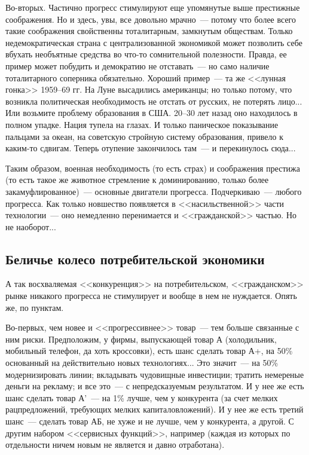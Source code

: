 \documentclass{scrbook}
\newcommand{\flqq}{<<}
\newcommand{\frqq}{>>}
\newcommand{\mdash}{~--- }
\newcommand{\ndash}{--}
\newcommand{\essaysection}[1]{\subsection*{#1}\nopagebreak}
\begin{document}
Во-вторых. Частично прогресс стимулируют еще упомянутые выше престижные соображения. Но и здесь, увы, все довольно мрачно{\mdash}потому что более всего такие соображения свойственны тоталитарным, замкнутым обществам. Только недемократическая страна с централизованной экономикой может позволить себе вбухать необъятные средства во что-то сомнительной полезности. Правда, ее пример может побудить и демократию не отставать{\mdash}но само наличие тоталитарного соперника обязательно. Хороший пример{\mdash}та же {\flqq}лунная гонка{\frqq} 1959{\ndash}69 гг. На Луне высадились американцы; но только потому, что возникла политическая необходимость не отстать от русских, не потерять лицо... Или возьмите проблему образования в США. 20{\ndash}30 лет назад оно находилось в полном упадке. Нация тупела на глазах. И только паническое показывание пальцами за океан, на советскую стройную систему образования, привело к каким-то сдвигам. Теперь отупение закончилось там{\mdash}и перекинулось сюда...

Таким образом, военная необходимость (то есть страх) и соображения престижа (то есть такое же животное стремление к доминированию, только более закамуфлированное){\mdash}основные двигатели прогресса. Подчеркиваю{\mdash}любого прогресса. Как только новшество появляется в {\flqq}насильственной{\frqq} части технологии{\mdash}оно немедленно перенимается и {\flqq}гражданской{\frqq} частью. Но не наоборот...

\essaysection{Беличье колесо потребительской экономики}

А так восхваляемая {\flqq}конкуренция{\frqq} на потребительском, {\flqq}гражданском{\frqq} рынке никакого прогресса не стимулирует и вообще в нем не нуждается. Опять же, по пунктам.

Во-первых, чем новее и {\flqq}прогрессивнее{\frqq} товар{\mdash}тем больше связанные с ним риски. Предположим, у фирмы, выпускающей товар А (холодильник, мобильный телефон, да хоть кроссовки), есть шанс сделать товар А+, на 50\% основанный на действительно новых технологиях... Это значит{\mdash}на 50\% модернизировать линии; вкладывать чудовищные инвестиции; тратить немереные деньги на рекламу; и все это{\mdash}с непредсказуемым результатом. И у нее же есть шанс сделать товар А'{\mdash}на 1\% лучше, чем у конкурента (за счет мелких рацпредложений, требующих мелких капиталовложений). И у нее же есть третий шанс{\mdash}сделать товар АБ, не хуже и не лучше, чем у конкурента, а другой. С другим набором {\flqq}сервисных функций{\frqq}, например (каждая из которых по отдельности ничем новым не является и давно отработана).
\end{document}
